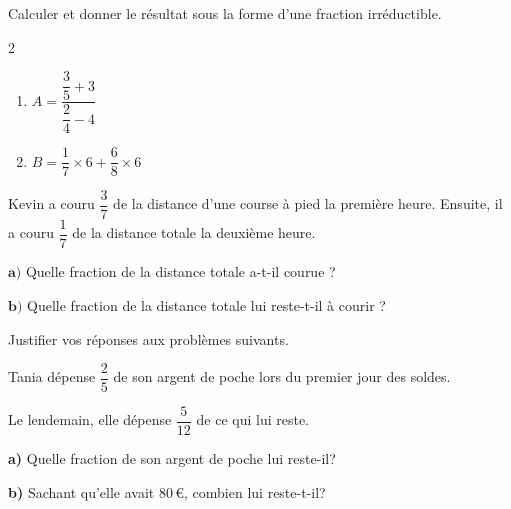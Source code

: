 \documentclass[a4paper,11pt,fleqn]{article}
\begin{document}
\begin{EXO}{}{}
Calculer et donner le résultat sous la forme d’une fraction irréductible.

\begin{multicols}{2}
\begin{enumerate}
	\item \begin{minipage}[t]{\linewidth} $A=\dfrac{\dfrac{3}{5}+3}{\dfrac{2}{4}-4}$ \end{minipage}
	\item \begin{minipage}[t]{\linewidth} $B=\dfrac{1}{7}\times6+\dfrac{6}{8}\times6$ \end{minipage}
\end{enumerate}
\end{multicols}
\end{EXO}

\begin{EXO}{}{}



 Kevin a couru $\dfrac{3}{7}$ de la distance d'une course à pied la première heure. Ensuite, il a couru $\dfrac{1}{7}$ de la distance totale la deuxième heure.

$\textbf{a)}$ Quelle fraction de la distance totale a-t-il courue ? 

            $\textbf{b)}$ Quelle fraction de la distance totale lui reste-t-il à courir ? 
\end{EXO}

\begin{EXO}{}{}
Justifier vos réponses aux problèmes suivants.


 Tania dépense $\dfrac{2}{5}$ de son argent de poche lors du premier jour des soldes.

Le lendemain, elle dépense $\dfrac{5}{12}$ de ce qui lui reste.  

 \textbf {a)}  Quelle fraction de son argent de poche lui reste-il? 

 \textbf {b)}  Sachant qu'elle avait 80\,\euro{}, combien lui reste-t-il? 
\end{EXO}
\end{document}

